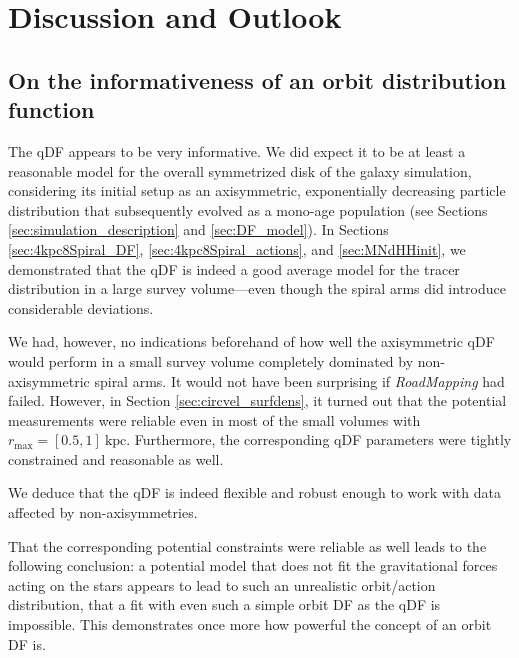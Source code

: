 \documentclass[iop,revtex4,numberedappendix,appendixfloats]{emulateapj}
\newcommand{\RM}{{\sl RoadMapping}}
\begin{document}
\section{Discussion and Outlook} \label{sec:discussion}

\subsection{On the informativeness of an orbit distribution function}

The qDF appears to be very informative. We did expect it to be at least a reasonable model for the overall symmetrized disk of the galaxy simulation, considering its initial setup as an axisymmetric, exponentially decreasing particle distribution that subsequently evolved as a mono-age population (see Sections \ref{sec:simulation_description} and \ref{sec:DF_model}). In Sections \ref{sec:4kpc8Spiral_DF}, \ref{sec:4kpc8Spiral_actions}, and \ref{sec:MNdHHinit}, we demonstrated that the qDF is indeed a good average model for the tracer distribution in a large survey volume---even though the spiral arms did introduce considerable deviations.

We had, however, no indications beforehand of how well the axisymmetric qDF would perform in a small survey volume completely dominated by non-axisymmetric spiral arms. It would not have been surprising if \RM{} had failed. However, in Section \ref{sec:circvel_surfdens}, it turned out that the potential measurements were reliable even in most of the small volumes with $r_\text{max}=[0.5,1]~\text{kpc}$. Furthermore, the corresponding qDF parameters were tightly constrained and reasonable as well. 

We deduce that the qDF is indeed flexible and robust enough to work with data affected by non-axisymmetries.

That the corresponding potential constraints were reliable as well leads to the following conclusion: a potential model that does not fit the gravitational forces acting on the stars appears to lead to such an unrealistic orbit/action distribution, that a fit with even such a simple orbit DF as the qDF is impossible. This demonstrates once more how powerful the concept of an orbit DF is.
\end{document}
